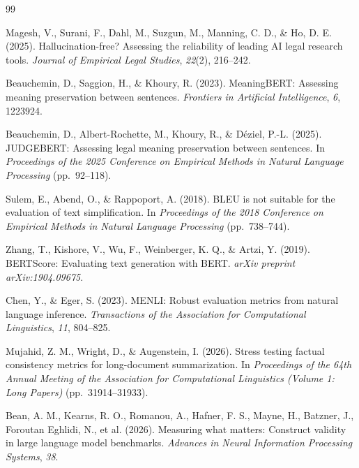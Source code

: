 
\begin{thebibliography}{99}

Magesh, V., Surani, F., Dahl, M., Suzgun, M., Manning, C. D., \& Ho, D. E.
(2025). Hallucination-free? Assessing the reliability of leading AI legal
research tools. \textit{Journal of Empirical Legal Studies}, \textit{22}(2),
216--242.

Beauchemin, D., Saggion, H., \& Khoury, R. (2023). MeaningBERT: Assessing
meaning preservation between sentences. \textit{Frontiers in Artificial
Intelligence}, \textit{6}, 1223924.

Beauchemin, D., Albert-Rochette, M., Khoury, R., \& D\'eziel, P.-L. (2025).
JUDGEBERT: Assessing legal meaning preservation between sentences. In
\textit{Proceedings of the 2025 Conference on Empirical Methods in Natural
Language Processing} (pp.~92--118).

Sulem, E., Abend, O., \& Rappoport, A. (2018). BLEU is not suitable for the
evaluation of text simplification. In \textit{Proceedings of the 2018 Conference
on Empirical Methods in Natural Language Processing} (pp.~738--744).

Zhang, T., Kishore, V., Wu, F., Weinberger, K. Q., \& Artzi, Y. (2019).
BERTScore: Evaluating text generation with BERT. \textit{arXiv preprint
arXiv:1904.09675}.

Chen, Y., \& Eger, S. (2023). MENLI: Robust evaluation metrics from natural
language inference. \textit{Transactions of the Association for Computational
Linguistics}, \textit{11}, 804--825.

Mujahid, Z. M., Wright, D., \& Augenstein, I. (2026). Stress testing factual
consistency metrics for long-document summarization. In \textit{Proceedings of
the 64th Annual Meeting of the Association for Computational Linguistics (Volume
1: Long Papers)} (pp.~31914--31933).

Bean, A. M., Kearns, R. O., Romanou, A., Hafner, F. S., Mayne, H., Batzner, J.,
Foroutan Eghlidi, N., et al. (2026). Measuring what matters: Construct validity
in large language model benchmarks. \textit{Advances in Neural Information
Processing Systems}, \textit{38}.


\end{thebibliography}
